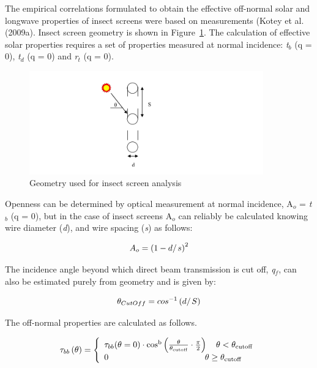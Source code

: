 The empirical correlations formulated to obtain the effective off-normal solar and longwave properties of insect screens were based on measurements (Kotey et al. (2009a). Insect screen geometry is shown in Figure~\ref{fig:geometry-used-for-insect-screen-analysis}. The calculation of effective solar properties requires a set of properties measured at normal incidence: \emph{t}\(_{b}\) (q = 0), \emph{t}\(_{d}\) (q = 0) and \emph{r}\(_{t}\) (q = 0).

\begin{figure}[hbtp] %
\centering
\includegraphics[width=0.9\textwidth, height=0.9\textheight, keepaspectratio=true]{media/image1857.svg.png}
\caption{Geometry used for insect screen analysis \protect \label{fig:geometry-used-for-insect-screen-analysis}}
\end{figure}

Openness can be determined by optical measurement at normal incidence, A\(_{o}\) = \emph{t}\(_{b}\) (q = 0), but in the case of insect screens A\(_{o}\) can reliably be calculated knowing wire diameter (\emph{d}), and wire spacing (\emph{s}) as follows:

\begin{equation}
{A_o} = {\left( {1 - {d \mathord{\left/ {\vphantom {d s}} \right. } s}} \right)^2}
\end{equation}

The incidence angle beyond which direct beam transmission is cut off, \emph{q}\(_{f}\), can also be estimated purely from geometry and is given by:

\begin{equation}
{\theta_{CutOff}} = co{s^{ - 1}}\left( {{d \mathord{\left/ {\vphantom {d S}} \right. } S}} \right)
\end{equation}

The off-normal properties are calculated as follows.

\begin{equation}
{\tau_{bb}}\left( {\rm{\theta }} \right) = \left\{ \begin{array}{l}{\tau_{bb}}{\rm{(\theta }} = {\rm{0)}} \cdot {\rm{co}}{{\rm{s}}^{\rm{b}}}\left( {\frac{{\rm{\theta }}}{{{{\rm{\theta }}_{{\rm{cutoff}}}}}} \cdot \frac{\pi }{{\rm{2}}}} \right)\quad {\rm{\theta }} < {{\rm{\theta }}_{{\rm{cutoff}}}}\\0\quad \quad \quad \quad \quad \quad \quad \quad \quad \quad \quad \;\,{\rm{\theta }} \ge {{\rm{\theta }}_{{\rm{cutoff}}}}\end{array} \right.
\end{equation}

